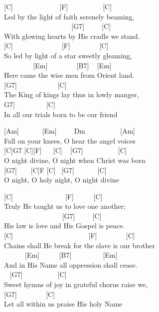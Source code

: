 \documentclass[
  letterpaper,
]{scrbook}
\begin{document}
{[}C{]} ~ ~ ~ ~ ~ ~ ~ ~{[}F{]} ~ ~ ~ ~ ~ ~{[}C{]}\\
Led by the light of faith serenely beaming,\\
\hspace*{0.333em} ~ ~ ~ ~ ~ ~ ~ ~ ~ ~ ~ ~{[}G7{]} ~ ~ ~{[}C{]}\\
With glowing hearts by His cradle we stand.\\
{[}C{]} ~ ~ ~ ~ ~ ~ ~ ~ {[}F{]} ~ ~ ~ ~ ~{[}C{]}\\
So led by light of a star sweetly gleaming,\\
\hspace*{0.333em} ~ ~ ~ ~ ~ {[}Em{]} ~ ~ ~ ~ ~{[}B7{]} ~ {[}Em{]}\\
Here came the wise men from Orient land.\\
\hspace*{0.333em} {[}G7{]} ~ ~ ~ ~ ~ ~ ~{[}C{]}\\
The King of kings lay thus in lowly manger,\\
\hspace*{0.333em}{[}G7{]} ~ ~ ~ ~ ~ {[}C{]}\\
In all our trials born to be our friend

{[}Am{]} ~ ~ ~ ~{[}Em{]} ~ ~ ~Dm ~ ~ ~ ~ ~ ~{[}Am{]}\\
Fall on your knees, O hear the angel voices\\
{[}C{]}G7 {[}C{]}{[}F{]} ~ ~{[}C{]} ~ {[}G7{]} ~ ~ ~ ~ ~ ~{[}C{]}\\
O night divine, O night when Christ was born\\
{[}G7{]} ~ ~ {[}C{]}F {[}C{]} ~{[}G7{]} ~ ~ ~ ~{[}C{]}\\
O night, O holy night, O night divine

{[}C{]} ~ ~ ~ ~ ~ ~ ~ ~ ~{[}F{]} ~ ~ ~ {[}C{]}\\
Truly He taught us to love one another;\\
\hspace*{0.333em} ~ ~ ~ ~ ~ ~ ~ ~ ~ ~ {[}G7{]} ~ ~ ~{[}C{]}\\
His law is love and His Gospel is peace.\\
{[}C{]} ~ ~ ~ ~ ~ ~ ~ ~ ~ ~ ~ ~ ~{[}F{]} ~ ~ ~ ~ ~{[}C{]}\\
Chains shall He break for the slave is our brother\\
\hspace*{0.333em} ~ ~ ~ ~{[}Em{]} ~ ~ ~ {[}B7{]} ~ ~ ~ ~ ~ {[}Em{]}\\
And in His Name all oppression shall cease.\\
\hspace*{0.333em} ~ {[}G7{]} ~ ~ ~ ~ ~ ~{[}C{]}\\
Sweet hymns of joy in grateful chorus raise we,\\
\hspace*{0.333em} {[}G7{]} ~ ~ ~ ~ ~{[}C{]}\\
Let all within us praise His holy Name
\end{document}
